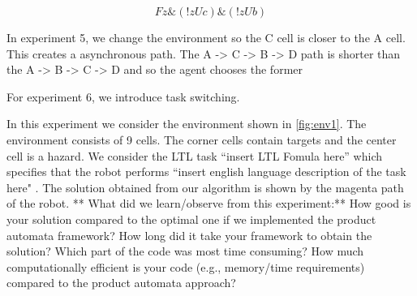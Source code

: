 \documentclass[letter paper, 10 pt, conference]{ieeeconf}
\begin{document}
\begin{equation}
  Fz \& (!z U c) \& (!z U b)
  \label{equ:basic-ab}
\end{equation}

In experiment 5, we change the environment so the C cell is closer to the A cell. This creates a asynchronous path. The A -> C -> B -> D path is shorter than the A -> B -> C -> D and so the agent chooses the former

For experiment 6, we introduce task switching.


In this experiment we consider the environment shown in \ref{fig:env1}.
The environment consists of 9 cells. The corner cells contain targets and the center cell is a hazard.
We consider the LTL task ``insert LTL Fomula here'' which specifies that the robot performs ``insert english language description of the task here" .
The solution obtained from our algorithm is shown by the magenta path of the robot.
** What did we learn/observe from this experiment:**
How good is your solution compared to the optimal one if we implemented the product automata framework?
How long did it take your framework to obtain the solution?
Which part of the code was most time consuming?
How much computationally efficient is your code  (e.g., memory/time requirements) compared to the product automata approach?


% 
\end{document}
